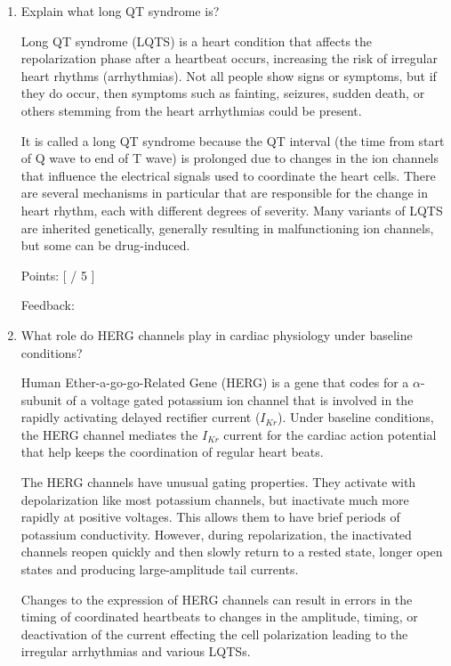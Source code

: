 \documentclass[basic,plain]{inVerba-notes}
\begin{document}
\begin{enumerate}\color{minimal}
    \item Explain what long QT syndrome is?
    
    {\color{black}
        Long QT syndrome (LQTS) is a heart condition that affects the repolarization phase after a heartbeat occurs, increasing the risk of irregular heart rhythms (arrhythmias). Not all people show signs or symptoms, but if they do occur, then symptoms such as fainting, seizures, sudden death, or others stemming from the heart arrhythmias could be present. 
        
        It is called a long QT syndrome because the QT interval (the time from start of Q wave to end of T wave) is prolonged due to changes in the ion channels that influence the electrical signals used to coordinate the heart cells. There are several mechanisms in particular that are responsible for the change in heart rhythm, each with different degrees of severity. Many variants of LQTS are inherited genetically, generally resulting in malfunctioning ion channels, but some can be drug-induced. }

    Points: [\hspace{16pt} / 5 ]

    Feedback: 

    \vspace*{50pt}

    \item What role do HERG channels play in cardiac physiology under baseline conditions? 
    {\color{black}

    Human Ether-a-go-go-Related Gene (HERG) is a gene that codes for a \(\alpha \)-subunit of a voltage gated potassium ion channel that is involved in the rapidly activating delayed rectifier current (\(I_{Kr}\)). Under baseline conditions, the HERG channel mediates the \(I_{Kr}\) current for the cardiac action potential that help keeps the coordination of regular heart beats.

    The HERG channels have unusual gating properties. They activate with depolarization like most potassium channels, but inactivate much more rapidly at positive voltages. This allows them to have brief periods of potassium conductivity. However, during repolarization, the inactivated channels reopen quickly and then slowly return to a rested state, longer open states and producing large-amplitude tail currents.

    Changes to the expression of HERG channels can result in errors in the timing of coordinated heartbeats to changes in the amplitude, timing, or deactivation of the current effecting the cell polarization leading to the irregular arrhythmias and various LQTSs.}


\end{enumerate}
\end{document}
